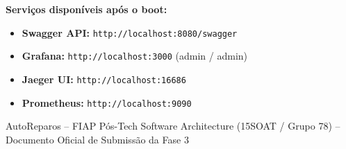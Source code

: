 \documentclass[9pt,a4paper]{article}
\begin{document}
\begin{tcolorbox}[cardbox]
\begin{minipage}[t]{0.43\textwidth}
        \vspace{0.04cm}
        \textbf{\scriptsize Serviços disponíveis após o boot:}
        \begin{itemize}\setlength{\itemsep}{0.5pt}\setlength{\parskip}{0pt}\tiny
            \item \textbf{Swagger API:} \texttt{http://localhost:8080/swagger}
            \item \textbf{Grafana:} \texttt{http://localhost:3000} (admin / admin)
            \item \textbf{Jaeger UI:} \texttt{http://localhost:16686}
            \item \textbf{Prometheus:} \texttt{http://localhost:9090}
        \end{itemize}
    \end{minipage}
\end{tcolorbox}

\vspace{0.1cm}
\begin{center}
    \scriptsize \color{gray} AutoReparos -- FIAP Pós-Tech Software Architecture (15SOAT / Grupo 78) -- Documento Oficial de Submissão da Fase 3
\end{center}
\end{document}
